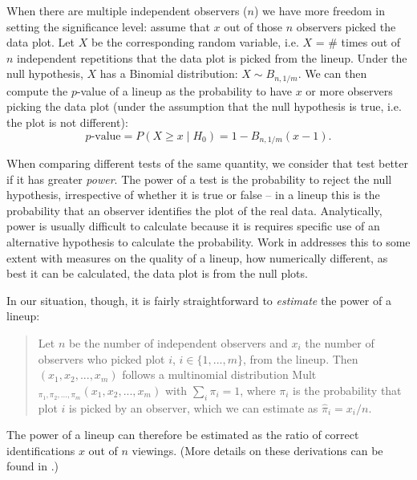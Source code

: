 When there are multiple independent observers ($n$) we have more freedom in setting  the significance level: assume that $x$ out of those $n$ observers picked the data plot. Let $X$ be the corresponding random variable, i.e. $X$ = \# times out of $n$ independent repetitions that  the data plot is picked from the lineup. Under the null hypothesis, $X$ has a Binomial distribution: $X \sim B_{n, 1/m}$. We can then compute the $p$-value of a lineup as the probability to have $x$ or more observers picking the data plot (under the assumption that the null hypothesis is true, i.e. the plot is not different):
\[
p\text{-value} = P(X \ge x \mid H_0) =   1 - B_{n, 1/m} (x-1).
\]

When comparing different tests of the same quantity, we consider that
test better if it has greater {\it power}.  The power of a test is the
probability to reject the null hypothesis, irrespective of whether it
is true or false -- in a lineup this is the probability that an
observer identifies the plot of the real data.  Analytically, power is
usually difficult to calculate because it is requires specific use of
an alternative hypothesis to calculate the probability.  Work in
\citet{niladri:2012} addresses this to some extent with measures on
the quality of a lineup, how numerically different, as best it can be
calculated, the data plot is from the null plots.

In our situation, though, it is fairly straightforward to {\it estimate} the power of a lineup:

\begin{quote}
Let $n$ be the number of independent observers and $x_i$ the number of observers who picked plot $i$, $i \in \{1, ..., m\}$, from the lineup. Then $(x_1, x_2, ..., x_m)$ follows a multinomial distribution Mult$_{\pi_1, \pi_2, ..., \pi_m}(x_1, x_2, ..., x_m)$ with $\sum_i \pi_i = 1$, where $\pi_i$ is the probability that plot $i$ is picked by an observer, which we can estimate as $\widehat{\pi}_i = x_i/n$. 
\end{quote}

\noindent The power of a lineup can therefore be estimated as the ratio of correct identifications $x$ out of $n$ viewings. (More details on these derivations can be found in \citet{majumder:2012}.)

